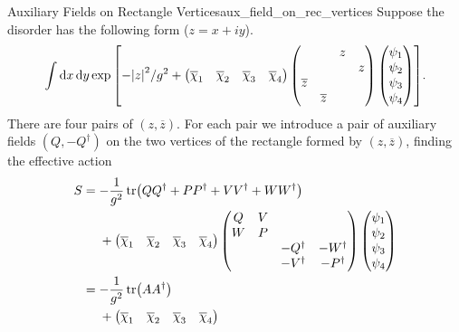 \documentclass{article}
\begin{document}
\begin{example}{Auxiliary Fields on Rectangle Vertices}{aux_field_on_rec_vertices}
    Suppose the disorder has the following form ($z=x+iy$).
    \[ \int \dd{x} \dd{y} \exp\qty[-\abs{z}^2/g^2 + \begin{pmatrix}
        \overline{\chi}_1 & \overline{\chi}_2 & \overline{\chi}_3 & \overline{\chi}_4
    \end{pmatrix} \begin{pmatrix}
        & & z & \\
        & & & z \\
        \overline{z} & & & \\
        & \overline{z} & &
    \end{pmatrix} \begin{pmatrix}
        \psi_1 \\ \psi_2 \\ \psi_3 \\ \psi_4
    \end{pmatrix}]. \]
    There are four pairs of $(z,\overline{z})$.
    For each pair we introduce a pair of auxiliary fields $(Q, -Q^\dagger)$ on the two vertices of the rectangle formed by $(z,\overline{z})$, finding the effective action
    \begin{align*}
        S &= -\frac{1}{g^2} \tr(QQ^\dagger + PP^\dagger + VV^\dagger + WW^\dagger) \\
        &\phantom{{}={}} + \begin{pmatrix}
            \overline{\chi}_1 & \overline{\chi}_2 & \overline{\chi}_3 & \overline{\chi}_4
        \end{pmatrix} \begin{pmatrix}
            Q & V & & \\
            W & P & & \\
            & & -Q^\dagger & -W^\dagger \\
            & & -V^\dagger & -P^\dagger
        \end{pmatrix} \begin{pmatrix}
            \psi_1 \\ \psi_2 \\ \psi_3 \\ \psi_4
        \end{pmatrix} \\
        &= -\frac{1}{g^2}\tr(AA^\dagger) \\
        &\phantom{{}={}} + \begin{pmatrix}
            \overline{\chi}_1 & \overline{\chi}_2 & \overline{\chi}_3 & \overline{\chi}_4

\end{pmatrix}
\end{align*}
\end{example}
\end{document}
